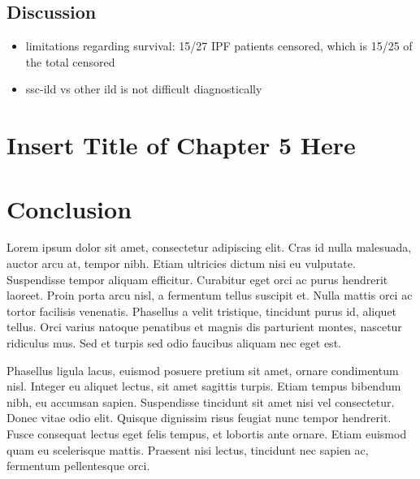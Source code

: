 \documentclass[
]{article}
\providecommand{\tightlist}{%
  \setlength{\itemsep}{0pt}\setlength{\parskip}{0pt}}
\begin{document}
\subsection{Discussion}\label{discussion-2}

\begin{itemize}
\tightlist
\item
  limitations regarding survival: 15/27 IPF patients censored, which is 15/25 of the total censored
\item
  ssc-ild vs other ild is not difficult diagnostically
\end{itemize}

\clearpage

\section{Insert Title of Chapter 5 Here}\label{insert-title-of-chapter-5-here}

\renewcommand{\thefigure}{5.\arabic{figure}}
\setcounter{figure}{0}
\renewcommand{\thetable}{5.\arabic{table}}
\setcounter{table}{0}
\renewcommand{\theequation}{5.\arabic{equation}}
\setcounter{equation}{0}

\clearpage

\section{Conclusion}\label{conclusion}

Lorem ipsum dolor sit amet, consectetur adipiscing elit. Cras id nulla malesuada, auctor arcu at, tempor nibh. Etiam ultricies dictum nisi eu vulputate. Suspendisse tempor aliquam efficitur. Curabitur eget orci ac purus hendrerit laoreet. Proin porta arcu nisl, a fermentum tellus suscipit et. Nulla mattis orci ac tortor facilisis venenatis. Phasellus a velit tristique, tincidunt purus id, aliquet tellus. Orci varius natoque penatibus et magnis dis parturient montes, nascetur ridiculus mus. Sed et turpis sed odio faucibus aliquam nec eget est.

Phasellus ligula lacus, euismod posuere pretium sit amet, ornare condimentum nisl. Integer eu aliquet lectus, sit amet sagittis turpis. Etiam tempus bibendum nibh, eu accumsan sapien. Suspendisse tincidunt sit amet nisi vel consectetur. Donec vitae odio elit. Quisque dignissim risus feugiat nunc tempor hendrerit. Fusce consequat lectus eget felis tempus, et lobortis ante ornare. Etiam euismod quam eu scelerisque mattis. Praesent nisi lectus, tincidunt nec sapien ac, fermentum pellentesque orci.
\end{document}
